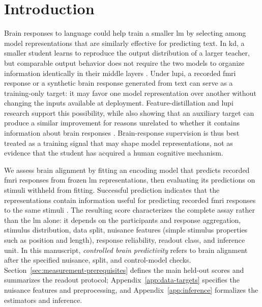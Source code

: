 \section{Introduction}
\label{sec:introduction}

Brain responses to language could help train a smaller \ac{lm} by selecting among model representations that are similarly effective for predicting text.
In \ac{kd}, a smaller student learns to reproduce the output distribution of a larger teacher, but comparable output behavior does not require the two models to organize information identically in their middle layers \autocite{hinton2015}.
Under \ac{lupi}, a recorded \ac{fmri} response or a synthetic brain response generated from text can serve as a training-only target: it may favor one model representation over another without changing the inputs available at deployment.
Feature-distillation and \ac{lupi} research support this possibility, while also showing that an auxiliary target can produce a similar improvement for reasons unrelated to whether it contains information about brain responses \autocite{lopezpaz2016,saadi2025}.
Brain-response supervision is thus best treated as a training signal that may shape model representations, not as evidence that the student has acquired a human cognitive mechanism.

We assess brain alignment by fitting an encoding model that predicts recorded \ac{fmri} responses from frozen \ac{lm} representations, then evaluating its predictions on stimuli withheld from fitting.
Successful prediction indicates that the representations contain information useful for predicting recorded \ac{fmri} responses to the same stimuli \autocite{oota2023,merlin2024}.
The resulting score characterizes the complete assay rather than the \ac{lm} alone: it depends on the participants and response aggregation, stimulus distribution, data split, nuisance features (simple stimulus properties such as position and length), response reliability, readout class, and inference unit.
In this manuscript, \emph{controlled brain predictivity} refers to brain alignment after the specified nuisance, split, and control-model checks.
Section~\ref{sec:measurement-prerequisites} defines the main held-out scores and summarizes the readout protocol; Appendix~\ref{app:data-targets} specifies the nuisance features and preprocessing, and Appendix~\ref{app:inference} formalizes the estimators and inference.

